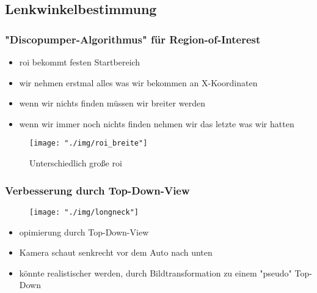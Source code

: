 \documentclass{beamer}
\begin{document}
	\subsection{Lenkwinkelbestimmung}
	
	\begin{frame}
		\frametitle{"Discopumper-Algorithmus" für Region-of-Interest}
		\begin{itemize}
			\item roi bekommt festen Startbereich
			\item wir nehmen erstmal alles was wir bekommen an X-Koordinaten
			\item wenn wir nichts finden müssen wir breiter werden
			\item wenn wir immer noch nichts finden nehmen wir das letzte was wir hatten
		\end{itemize}

		\begin{center}
			\begin{figure}[h]
				\texttt{[image: "./img/roi\_breite"]}
				\label{fig:roi}
				\caption{Unterschiedlich große roi}
			\end{figure}
		\end{center}
 	\end{frame}

	\begin{frame}
		\frametitle{Verbesserung durch Top-Down-View}
		\begin{center}
			\begin{figure}[h]
				\texttt{[image: "./img/longneck"]}
				\label{fig:longneck}
			\end{figure}
		\end{center}

	\begin{itemize}
		\item opimierung durch Top-Down-View
		\item Kamera schaut senkrecht vor dem Auto nach unten
		\item könnte realistischer werden, durch Bildtransformation zu einem "pseudo" Top-Down 
	\end{itemize}
	\end{frame}
\end{document}
